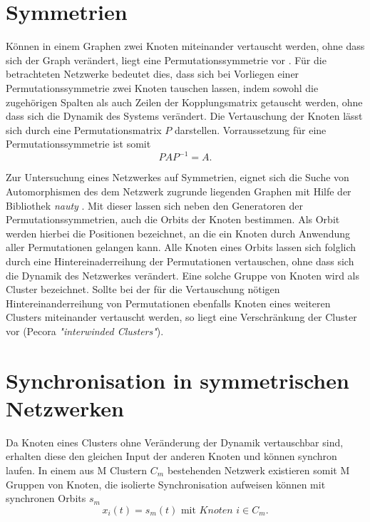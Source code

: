 \section{Symmetrien}
Können in einem Graphen zwei Knoten miteinander vertauscht werden, ohne dass sich der Graph verändert, liegt eine Permutationssymmetrie vor \cite{symmetrie}. Für die betrachteten Netzwerke bedeutet dies, dass sich bei Vorliegen einer Permutationssymmetrie zwei Knoten tauschen lassen, indem sowohl die zugehörigen Spalten als auch Zeilen der Kopplungsmatrix getauscht werden, ohne dass sich die Dynamik des Systems verändert. Die Vertauschung der Knoten lässt sich durch eine Permutationsmatrix $P$ darstellen. Vorraussetzung für eine Permutationssymmetrie ist somit\cite{pecora2014}
\begin{equation}
PAP^{-1}=A.
\end{equation}

Zur Untersuchung eines Netzwerkes auf Symmetrien, eignet sich die Suche von Automorphismen des dem Netzwerk zugrunde liegenden Graphen mit Hilfe der Bibliothek \textit{nauty} \cite{nauty}. Mit dieser lassen sich neben den Generatoren der Permutationssymmetrien, auch die Orbits der Knoten bestimmen. Als Orbit werden hierbei die Positionen bezeichnet, an die ein Knoten durch Anwendung aller Permutationen gelangen kann. Alle Knoten eines Orbits lassen sich folglich durch eine Hintereinaderreihung der Permutationen vertauschen, ohne dass sich die Dynamik des Netzwerkes verändert. Eine solche Gruppe von Knoten wird als Cluster bezeichnet. Sollte bei der für die Vertauschung nötigen Hintereinanderreihung von Permutationen ebenfalls Knoten eines weiteren Clusters miteinander vertauscht werden, so liegt eine Verschränkung der Cluster vor (Pecora\citep{pecora2014} \textit{"interwinded Clusters"}).

\section{Synchronisation in symmetrischen Netzwerken}
Da Knoten eines Clusters ohne Veränderung der Dynamik vertauschbar sind, erhalten diese den gleichen Input der anderen Knoten und können synchron laufen. In einem aus M Clustern $C_m$ bestehenden Netzwerk existieren somit M Gruppen von Knoten, die isolierte Synchronisation aufweisen können mit synchronen Orbits $s_m$
\begin{equation}
x_i(t)=s_m(t) \text{ mit } \textit{Knoten } i\in C_m.
\end{equation}

